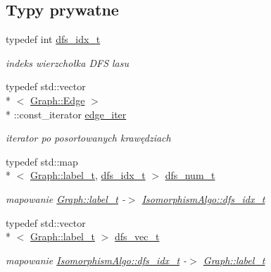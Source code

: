 \subsection*{Typy prywatne}
\begin{DoxyCompactItemize}
\item 
typedef int \hyperlink{classIsomorphismAlgo_ab4ec6489271a99fae3bd2476b22ef35b}{dfs\-\_\-idx\-\_\-t}
\begin{DoxyCompactList}\small\item\em indeks wierzchołka D\-F\-S lasu \end{DoxyCompactList}\item 
typedef std\-::vector\\*
$<$ \hyperlink{structGraph_1_1Edge}{Graph\-::\-Edge} $>$\\*
\-::const\-\_\-iterator \hyperlink{classIsomorphismAlgo_a2c5e2b83f11243efd51460172b3b0cfa}{edge\-\_\-iter}
\begin{DoxyCompactList}\small\item\em iterator po posortowanych krawędziach \end{DoxyCompactList}\item 
typedef std\-::map\\*
$<$ \hyperlink{classGraph_a2237a0ada8484c37b8200c0e3685ca71}{Graph\-::label\-\_\-t}, \hyperlink{classIsomorphismAlgo_ab4ec6489271a99fae3bd2476b22ef35b}{dfs\-\_\-idx\-\_\-t} $>$ \hyperlink{classIsomorphismAlgo_a848c1d965a1c201d768513f756629bbe}{dfs\-\_\-num\-\_\-t}
\begin{DoxyCompactList}\small\item\em mapowanie \hyperlink{classGraph_a2237a0ada8484c37b8200c0e3685ca71}{Graph\-::label\-\_\-t} -\/$>$ \hyperlink{classIsomorphismAlgo_ab4ec6489271a99fae3bd2476b22ef35b}{Isomorphism\-Algo\-::dfs\-\_\-idx\-\_\-t} \end{DoxyCompactList}\item 
typedef std\-::vector\\*
$<$ \hyperlink{classGraph_a2237a0ada8484c37b8200c0e3685ca71}{Graph\-::label\-\_\-t} $>$ \hyperlink{classIsomorphismAlgo_a906dbedec7eb2192c4a8963323031704}{dfs\-\_\-vec\-\_\-t}
\begin{DoxyCompactList}\small\item\em mapowanie \hyperlink{classIsomorphismAlgo_ab4ec6489271a99fae3bd2476b22ef35b}{Isomorphism\-Algo\-::dfs\-\_\-idx\-\_\-t} -\/$>$ \hyperlink{classGraph_a2237a0ada8484c37b8200c0e3685ca71}{Graph\-::label\-\_\-t} \end{DoxyCompactList}\end{DoxyCompactItemize}
